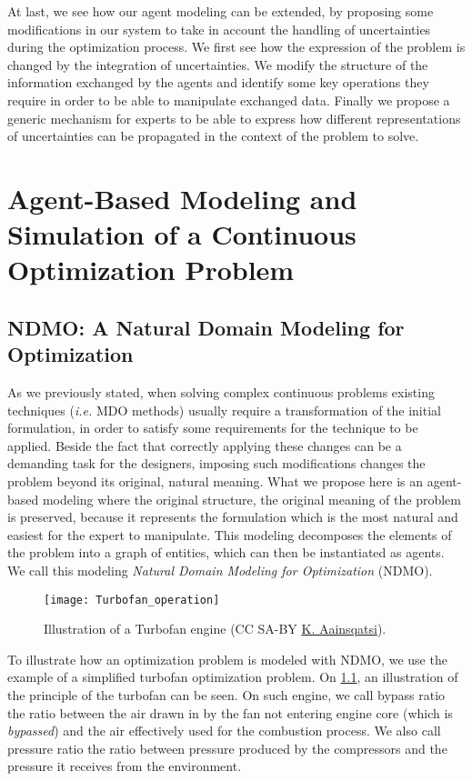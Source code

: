 At last, we see how our agent modeling can be extended, by proposing some modifications in our system to take in account the handling of uncertainties during the optimization process. We first see how the expression of the problem is changed by the integration of uncertainties. We modify the structure of the information exchanged by the agents and identify some key operations they require in order to be able to manipulate exchanged data. Finally we propose a generic mechanism for experts to be able to express how different representations of uncertainties can be propagated in the context of the problem to solve.

\chapter{Agent-Based Modeling and Simulation of a Continuous Optimization Problem}

\section{NDMO: A Natural Domain Modeling for Optimization}\label{modeling}

As we previously stated, when solving complex continuous problems existing techniques (\emph{i.e.} MDO methods) usually require a transformation of the initial formulation, in order to satisfy some requirements for the technique to be applied. Beside the fact that correctly applying these changes can be a demanding task for the designers, imposing such modifications changes the problem beyond its original, natural meaning. What we propose here is an agent-based modeling where the original structure, the original meaning of the problem is preserved, because it represents the formulation which is the most natural and easiest for the expert to manipulate. This modeling decomposes the elements of the problem into a graph of entities, which can then be instantiated as agents. We call this modeling \emph{Natural Domain Modeling for Optimization} (NDMO).

\begin{figure}[]
	\centering
	\texttt{[image: Turbofan\_operation]}
	\caption{Illustration of a Turbofan engine (CC SA-BY \href{http://en.wikipedia.org/wiki/File:Turbofan_operation.svg}{K. Aainsqatsi}).}
	\label{turbofan_illu}
\end{figure}

To illustrate how an optimization problem is modeled with NDMO, we use the example of a simplified turbofan optimization problem. On \figurename{} \ref{turbofan_illu}, an illustration of the principle of the turbofan can be seen. On such engine, we call bypass ratio the ratio between the air drawn in by the fan not entering engine core (which is \emph{bypassed}) and the air effectively used for the combustion process. We also call pressure ratio the ratio between pressure produced by the compressors and the pressure it receives from the environment.

